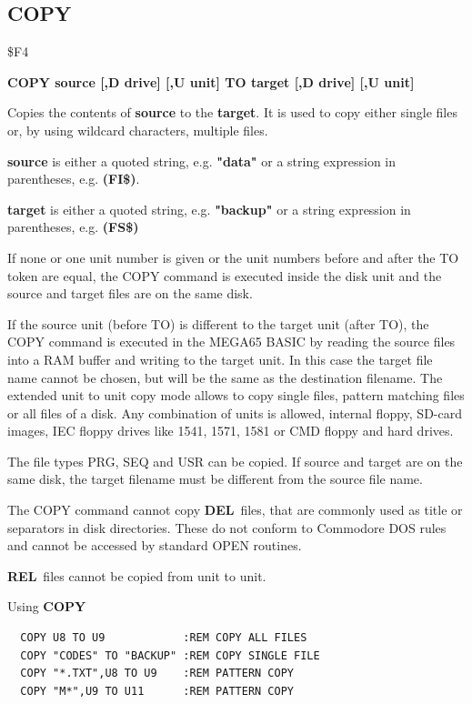 \subsection{COPY}
\begin{description}[leftmargin=2cm,style=nextline]
\item [Token:] \$F4
\item [Format:] {\bf COPY source [,D drive] [,U unit] TO
                target [,D drive] [,U unit] }
\item [Usage:]
   Copies the contents of
   {\bf source} to the {\bf target}.
   It is used to copy either single files or, by using
   wildcard characters, multiple files.

   {\bf source} is either a quoted string, e.g. {\bf "data"} or
   a string expression in parentheses, e.g. {\bf (FI\$)}.

   {\bf target} is either a quoted string, e.g. {\bf "backup"} or
   a string expression in parentheses, e.g. {\bf (FS\$)}

   \drivedefinition

   \unitdefinition

   If none or one unit number is given or the unit numbers before and after
   the TO token are equal, the COPY command is executed inside the disk unit
   and the source and target files are on the same disk.

   If the source unit (before TO) is different to the target unit (after TO),
   the COPY command is executed in the MEGA65 BASIC by reading the source
   files into a RAM buffer and writing to the target unit. In this case
   the target file name cannot be chosen, but will be the same as the
   destination filename. The extended unit to unit copy mode allows to copy
   single files, pattern matching files or all files of a disk.
   Any combination of units is allowed, internal floppy, SD-card images,
   IEC floppy drives like 1541, 1571, 1581 or CMD floppy and hard drives.

\item [Remarks:]
   The file types PRG, SEQ and USR can be copied.
   If source and target are on the same disk, the target filename
   must be different from the source file name.

   The COPY command cannot copy {\bf DEL} files, that are commonly used
   as title or separators in disk directories. These do not conform to
   Commodore DOS rules and cannot be accessed by standard OPEN routines.

   {\bf REL} files cannot be copied from unit to unit.

\item [Example:] Using {\bf COPY}
\begin{tcolorbox}[colback=black,coltext=white]
\verbatimfont{\codefont}
\begin{verbatim}
  COPY U8 TO U9            :REM COPY ALL FILES
  COPY "CODES" TO "BACKUP" :REM COPY SINGLE FILE
  COPY "*.TXT",U8 TO U9    :REM PATTERN COPY
  COPY "M*",U9 TO U11      :REM PATTERN COPY
\end{verbatim}
\end{tcolorbox}
\end{description}


